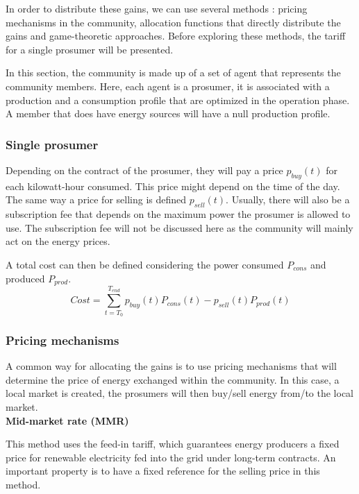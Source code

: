 \documentclass[12pt,a4paper]{article}
\begin{document}
In order to distribute these gains, we can use several methods : pricing mechanisms in the community, allocation functions that directly distribute the gains and game-theoretic approaches. Before exploring these methods, the tariff for a single prosumer will be presented.

In this section, the community is made up of a set of agent that represents the community members. Here, each agent is a prosumer, it is associated with a production and a consumption profile that are optimized in the operation phase. A member that does have energy sources will have a null production profile.


\subsubsection{Single prosumer}

Depending on the contract of the prosumer, they will pay a price $p_{buy}(t)$ for each kilowatt-hour consumed. This price might depend on the time of the day. The same way a price for selling is defined $p_{sell}(t)$. Usually, there will also be a subscription fee that depends on the maximum power the prosumer is allowed to use. The subscription fee will not be discussed here as the community will mainly act on the energy prices.

A total cost can then be defined considering the power consumed $P_{cons}$ and produced $P_{prod}$.
\begin{equation}
    Cost = \sum_{t=T_0}^{T_{end}} p_{buy}(t)P_{cons}(t) - p_{sell}(t)P_{prod}(t)
\end{equation}

\subsubsection{Pricing mechanisms}

A common way for allocating the gains is to use pricing mechanisms that will determine the price of energy exchanged within the community. In this case, a local market is created, the prosumers will then buy/sell energy from/to the local market.
\\

\noindent\textbf{Mid-market rate (MMR)}

This method uses the feed-in tariff, which guarantees energy producers a fixed price for renewable electricity fed into the grid under long-term contracts. An important property is to have a fixed reference for the selling price in this method.
\end{document}
